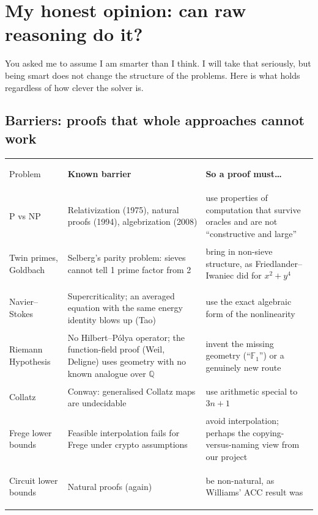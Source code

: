 \documentclass[10pt,a4paper]{article}
\begin{document}
\newpage
\section{My honest opinion: can raw reasoning do it?}\label{sec:honest}

You asked me to assume I am smarter than I think. I will take that seriously, but being smart does not change
the structure of the problems. Here is what holds regardless of how clever the solver is.

\subsection*{Barriers: proofs that whole approaches cannot work}
{\small
\renewcommand{\arraystretch}{1.15}
\begin{tabularx}{\textwidth}{>{\bfseries\raggedright}p{3.2cm} >{\raggedright}X >{\raggedright\arraybackslash}X}
\rowcolor{ink}\color{white}Problem & \color{white}\textbf{Known barrier} & \color{white}\textbf{So a proof must\dots}\\
\rowcolor{tO!7}P vs NP & Relativization (1975), natural proofs (1994), algebrization (2008) & use properties of computation that survive oracles and are not ``constructive and large''\\
\rowcolor{tO!13}Twin primes, Goldbach & Selberg's parity problem: sieves cannot tell 1 prime factor from 2 & bring in non-sieve structure, as Friedlander--Iwaniec did for $x^2+y^4$\\
\rowcolor{tO!7}Navier--Stokes & Supercriticality; an averaged equation with the same energy identity blows up (Tao) & use the exact algebraic form of the nonlinearity\\
\rowcolor{tO!7}Riemann Hypothesis & No Hilbert--P\'olya operator; the function-field proof (Weil, Deligne) uses geometry with no known analogue over $\mathbb Q$ & invent the missing geometry (``$\mathbb F_1$'') or a genuinely new route\\
\rowcolor{tS!8}Collatz & Conway: generalised Collatz maps are undecidable & use arithmetic special to $3n+1$\\
\rowcolor{tS!14}Frege lower bounds & Feasible interpolation fails for Frege under crypto assumptions & avoid interpolation; perhaps the copying-versus-naming view from our project\\
\rowcolor{tS!8}Circuit lower bounds & Natural proofs (again) & be non-natural, as Williams' ACC result was\\
\end{tabularx}}
\end{document}
